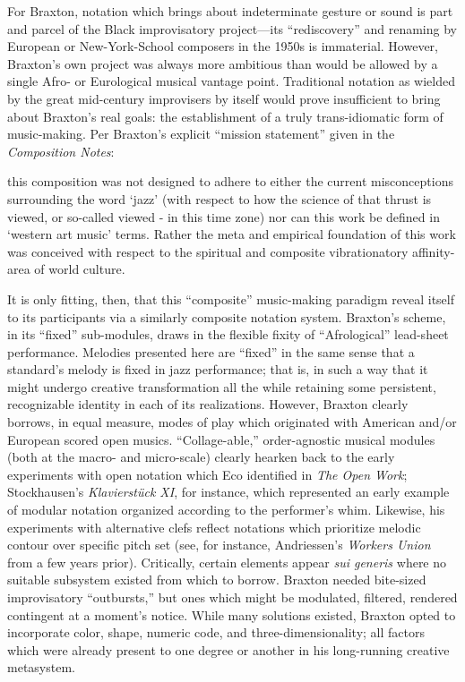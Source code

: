     \noindent For Braxton, notation which brings about indeterminate gesture or sound is part and parcel of the Black improvisatory project---its ``rediscovery'' and renaming by European or New-York-School composers in the 1950s is immaterial. However, Braxton's own project was always more ambitious than would be allowed by a single Afro- or Eurological musical vantage point. Traditional notation as wielded by the great mid-century improvisers by itself would prove insufficient to bring about Braxton's real goals: the establishment of a truly trans-idiomatic form of music-making. Per Braxton's explicit ``mission statement'' given in the \textit{Composition Notes}:

    \begin{smallquote}
        [...] this composition was not designed to adhere to either the current misconceptions surrounding the word `jazz' (with respect to how the science of that thrust is viewed, or so-called viewed - in this time zone) nor can this work be defined in `western art music' terms. Rather the meta and empirical foundation of this work was conceived with respect to the spiritual and composite vibrationatory affinity-area of world culture.\autocite[136-7]{Braxton_1988}
    \end{smallquote}

    It is only fitting, then, that this ``composite'' music-making paradigm reveal itself to its participants via a similarly composite notation system. Braxton's scheme, in its ``fixed'' sub-modules, draws in the flexible fixity of ``Afrological'' lead-sheet performance. Melodies presented here are ``fixed'' in the same sense that a standard's melody is fixed in jazz performance; that is, in such a way that it might undergo creative transformation all the while retaining some persistent, recognizable identity in each of its realizations. However, Braxton clearly borrows, in equal measure, modes of play which originated with American and/or European scored open musics. ``Collage-able,'' order-agnostic musical modules (both at the macro- and micro-scale) clearly hearken back to the early experiments with open notation which Eco identified in \textit{The Open Work}; Stockhausen's \textit{Klavierstück XI}, for instance, which represented an early example of modular notation organized according to the performer's whim.\autocite[1]{Eco_Robey_1989} Likewise, his experiments with alternative clefs reflect notations which prioritize melodic contour over specific pitch set (see, for instance, Andriessen's \textit{Workers Union} from a few years prior). Critically, certain elements appear \textit{sui generis} where no suitable subsystem existed from which to borrow. Braxton needed bite-sized improvisatory ``outbursts,'' but ones which might be modulated, filtered, rendered contingent at a moment's notice. While many solutions existed, Braxton opted to incorporate color, shape, numeric code, and three-dimensionality; all factors which were already present to one degree or another in his long-running creative metasystem.

